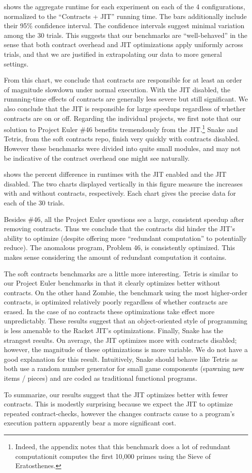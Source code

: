 

 shows the aggregate runtime for each experiment on each of the 4 configurations, normalized to the ``Contracts + JIT'' running time.
The bars additionally include their 95\% confidence interval.
The confidence intervals suggest minimal variation among the 30 trials.
This suggests that our benchmarks are ``well-behaved'' in the sense that both contract overhead and JIT optimizations apply uniformly across trials, and that we are justified in extrapolating our data to more general settings.

From this chart, we conclude that contracts are responsible for at least an order of magnitude slowdown under normal execution.
With the JIT disabled, the runnning-time effects of contracts are generally less severe but still significant.
We also conclude that the JIT is responsible for large speedups regardless of whether contracts are on or off.
Regarding the individual projects, we first note that our solution to Project Euler \#46 benefits tremendously from the JIT.\footnote{Indeed, the appendix notes that this benchmark does a lot of redundant computation\textemdash it computes the first 10,000 primes using the Sieve of Eratosthenes.}
Snake and Tetris, from the soft contracts repo, finish very quickly with contracts disabled.
However these benchmarks were divided into quite small modules, and may not be indicative of the contract overhead one might see naturally.

\newpage


 shows the percent difference in runtimes with the JIT enabled and the JIT disabled.
The two charts displayed vertically in this figure measure the increases with and without contracts, respectively.
Each chart gives the precise data for each of the 30 trials.

Besides \#46, all the Project Euler questions see a large, consistent speedup after removing contracts.
Thus we conclude that the contracts did hinder the JIT's ability to optimize (despite offering more ``redundant computation'' to potentially reduce).
The anomalous program, Problem 46, is consistently optimized.
This makes sense considering the amount of redundant computation it contains.

The soft contracts benchmarks are a little more interesting.
Tetris is similar to our Project Euler benchmarks in that it clearly optimizes better without contracts.
On the other hand Zombie, the benchmark using the most higher-order contracts, is optimized relatively poorly regardless of whether contracts are erased.
In the case of no contracts these optimizations take effect more unpredictably.
These results suggest that an object-oriented style of programming is less amenable to the Racket JIT's optimizations.
Finally, Snake has the strangest results.
On average, the JIT optimizes more with contracts disabled; however, the magnitude of these optimizations is more variable.
We do not have a good explanation for this result.
Intuitively, Snake should behave like Tetris as both use a random number generator for small game components (spawning new items / pieces) and are coded as traditional functional programs.

To summarize, our results suggest that the JIT optimizes better with fewer contracts.
This is modestly surprising because we expect the JIT to optimize repeated contract-checks, however the changes contracts cause to a program's execution pattern apparently bear a more significant cost.

